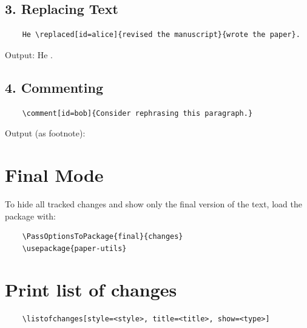 \documentclass{article}
\begin{document}
\subsection*{3. Replacing Text}

\begin{Verbatim}
	He \replaced[id=alice]{revised the manuscript}{wrote the paper}.
\end{Verbatim}

Output:
He .

\vspace{1em}

\subsection*{4. Commenting}

\begin{Verbatim}
	\comment[id=bob]{Consider rephrasing this paragraph.}
\end{Verbatim}

Output (as footnote):

\vspace{1em}

\section*{Final Mode}

To hide all tracked changes and show only the final version of the text, load the package with:

\begin{Verbatim}
	\PassOptionsToPackage{final}{changes}
	\usepackage{paper-utils}
\end{Verbatim}

\section*{Print list of changes}

\begin{Verbatim}
	\listofchanges[style=<style>, title=<title>, show=<type>]
\end{Verbatim}

\listofchanges[title={List of Changes}]
\end{document}
